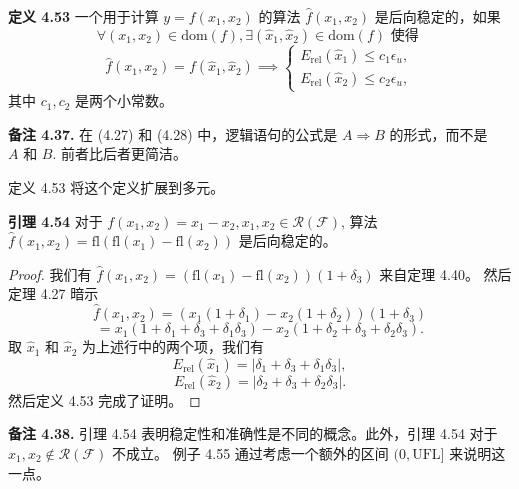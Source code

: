 \documentclass[a4paper]{ctexart}
\begin{document}
{\noindent \textbf{定义 4.53 } 一个用于计算 $y = f(x_1, x_2)$ 的算法 $\hat{f}(x_1, x_2)$ 是后向稳定的，如果
\[
\forall (x_1, x_2) \in \text{dom}(f), \exists (\hat{x}_1, \hat{x}_2) \in \text{dom}(f) \text{ 使得 }
\]
\[
\hat{f}(x_1, x_2) = f(\hat{x}_1, \hat{x}_2) \implies \left\{
\begin{array}{l}
E_{\text{rel}}(\hat{x}_1) \leq c_1\epsilon_u, \\
E_{\text{rel}}(\hat{x}_2) \leq c_2\epsilon_u,
\end{array}
\right. \tag{4.28}
\]
其中 $c_1, c_2$ 是两个小常数。

\noindent \textbf{备注 4.37.} 在 (4.27) 和 (4.28) 中，逻辑语句的公式是 $A \Rightarrow B$ 的形式，而不是 $A \text{ 和 } B$. 
前者比后者更简洁。


定义 4.53 将这个定义扩展到多元。

\noindent \textbf{引理 4.54 } 对于 $f(x_1, x_2) = x_1 - x_2, x_1, x_2 \in \mathcal{R}(\mathcal{F})$, 
算法 $\hat{f}(x_1, x_2) = \text{fl}(\text{fl}(x_1) - \text{fl}(x_2))$ 是后向稳定的。

\begin{proof}
我们有 $\hat{f}(x_1, x_2) = (\text{fl}(x_1) - \text{fl}(x_2))(1 + \delta_3)$ 来自定理 4.40。
然后定理 4.27 暗示
\[
  \hat{f}(x_1, x_2) = (x_1(1 + \delta_1) - x_2(1 + \delta_2))(1 + \delta_3)
\]
\[
  = x_1(1 + \delta_1 + \delta_3 + \delta_1\delta_3) - x_2(1 + \delta_2 + \delta_3 + \delta_2\delta_3).
\]
取 $\hat{x}_1$ 和 $\hat{x}_2$ 为上述行中的两个项，我们有
\[
  E_{\text{rel}}(\hat{x}_1) = |\delta_1 + \delta_3 + \delta_1\delta_3|,
\]
\[
  E_{\text{rel}}(\hat{x}_2) = |\delta_2 + \delta_3 + \delta_2\delta_3|.
\]
然后定义 4.53 完成了证明。
\end{proof}

\noindent \textbf{备注 4.38.} 引理 4.54 表明稳定性和准确性是不同的概念。此外，引理 4.54 对于 $x_1, x_2 \notin \mathcal{R}(\mathcal{F})$ 不成立。
例子 4.55 通过考虑一个额外的区间 $(0, \text{UFL}]$ 来说明这一点。

}
\end{document}
